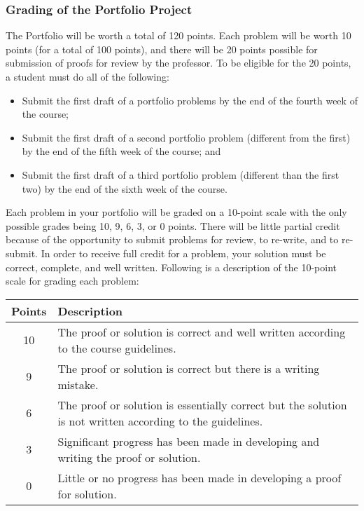 \subsubsection*{Grading of the Portfolio Project}
The Portfolio will be worth a total of 120 points. Each problem will be worth 10 points (for a total of 100 points), and there will be 20 points possible for submission of proofs for review by the professor.  To be eligible for the 20 points, a student must do all of the following:

\begin{itemize}
\item Submit the first draft of a portfolio problems by the end of the fourth week of the course;
\item Submit the first draft of a second portfolio problem (different from the first) by the end of the fifth week of the course; and 
\item Submit the first draft of a third portfolio problem (different than the first two) by the end of the sixth week of the course.
\end{itemize}

Each problem in your portfolio will be graded on a 10-point scale with the only possible grades being 10, 9, 6, 3, or 0 points.  There will be little partial credit because of the opportunity to submit problems for review, to re-write, and to re-submit. In order to receive full credit for a problem, your solution must be correct, complete, and well written.  Following is a description of the 10-point scale for grading each problem:

\begin{center}
\begin{tabular}[h]{| c | p{3in} |} \hline
Points  &  Description \\ \hline
10      &  The proof or solution is correct and well written according to the course guidelines.  \\ \hline
 9      &  The proof or solution is correct but there is a writing mistake.  \\ \hline
 6      &  The proof or solution is essentially correct but the solution is not written according to the guidelines.  \\ \hline
 3      &  Significant progress has been made in developing and writing the proof or solution. \\ \hline
 0      &  Little or no progress has been made in developing a proof for solution.  \\ \hline
\end{tabular}
\end{center}

